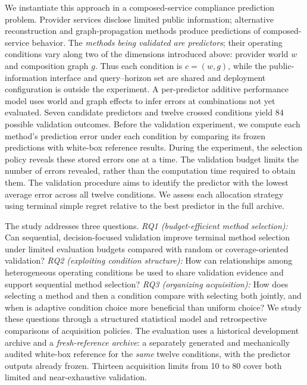 \documentclass[10pt,a4paper]{article}
\begin{document}
We instantiate this approach in a composed-service compliance prediction problem. Provider services disclose limited public information; alternative reconstruction and graph-propagation methods produce predictions of composed-service behavior. The \emph{methods being validated are predictors}; their operating conditions vary along two of the dimensions introduced above: provider world $w$ and composition graph $g$. Thus each condition is $c=(w,g)$, while the public-information interface and query--horizon set are shared and deployment configuration is outside the experiment. A per-predictor additive performance model uses world and graph effects to infer errors at combinations not yet evaluated. Seven candidate predictors and twelve crossed conditions yield 84 possible validation outcomes. Before the validation experiment, we compute each method's prediction error under each condition by comparing its frozen predictions with white-box reference results. During the experiment, the selection policy reveals these stored errors one at a time. The validation budget limits the number of errors revealed, rather than the computation time required to obtain them. The validation procedure aims to identify the predictor with the lowest average error across all twelve conditions. We assess each allocation strategy using terminal simple regret relative to the best predictor in the full archive.

The study addresses three questions. \emph{RQ1 (budget-efficient method selection):} Can sequential, decision-focused validation improve terminal method selection under limited evaluation budgets compared with random or coverage-oriented validation? \emph{RQ2 (exploiting condition structure):} How can relationships among heterogeneous operating conditions be used to share validation evidence and support sequential method selection? \emph{RQ3 (organizing acquisition):} How does selecting a method and then a condition compare with selecting both jointly, and when is adaptive condition choice more beneficial than uniform choice? We study these questions through a structured statistical model and retrospective comparisons of acquisition policies. The evaluation uses a historical development archive and a \emph{fresh-reference archive}: a separately generated and mechanically audited white-box reference for the \emph{same} twelve conditions, with the predictor outputs already frozen. Thirteen acquisition limits from 10 to 80 cover both limited and near-exhaustive validation.
\end{document}
